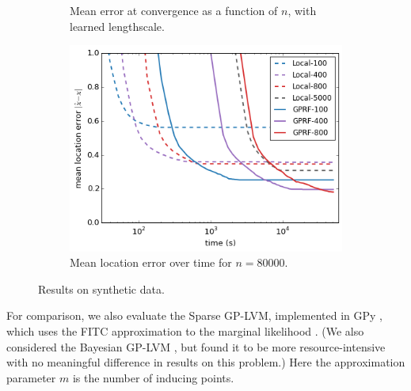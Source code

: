 \documentclass{article}
\begin{document}
\begin{figure}
\begin{subfigure}[t]{.33\textwidth}
                 \caption{Mean error at convergence as a
                   function of $n$, with learned
                   lengthscale.}
                 \label{fig:fitc_lscale}
         \end{subfigure}\hspace{0.3em}
 \begin{subfigure}[t]{.32\textwidth}
                 \includegraphics[width=\textwidth, trim=0 0 0 0 0cm, clip]{eighty_bytime}
                 \caption{Mean location error over time for $n=80000$.}
                 \label{fig:eighty}
         \end{subfigure}
\caption{Results on synthetic data.}
\label{fig:synthresults}
\vspace{-0.5cm}
\end{figure} 

For comparison, we also evaluate the Sparse GP-LVM, implemented in GPy
\cite{gpy2014}, which uses the FITC approximation to the
marginal likelihood \cite{lawrence2007learning}. (We also considered
the Bayesian GP-LVM \cite{titsias2010bayesian}, but found it to be more
resource-intensive with no meaningful difference in results on this
problem.) Here the approximation parameter $m$ is the number of inducing points. 
\end{document}
